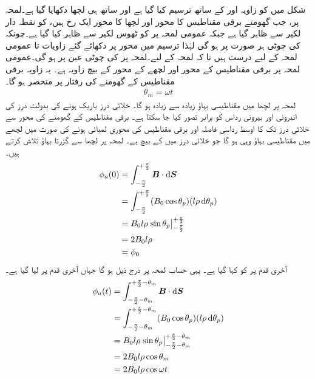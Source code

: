 %
شکل   میں  کو زاویہ  اور   کے ساتھ ترسیم کیا گیا ہے اور ساتھ ہی  لچھا  دکھایا گیا ہے۔لمحہ پر، جب  گھومتے برقی مقناطیس کا محور اور لچھا  کا محور ایک رخ  ہیں،    کو نقطہ دار  لکیر سے ظاہر گیا ہے جبکہ عمومی  لمحہ  پر   کو  ٹھوس لکیر سے   ظاہر کیا گیا ہے۔چونکہ  کی چوٹی ہر صورت  پر ہو گی لہٰذا  ترسیم میں محور  پر دکھائے گئے زاویات  تا  عمومی لمحہ  کے لیے درست  ہیں نا کہ لمحہ  کے لیے۔لمحہ  پر  کی چوٹی عین  پر ہو گی۔عمومی  لمحہ  پر برقی مقناطیس کے محور اور لچھے کے محور کے بیچ  زاویہ ہے۔ یہ زاویہ برقی مقناطیس کے گھومنے کی رفتار  پر منحصر ہو گا۔
\begin{align}
\theta_m=\omega t
\end{align}
لمحہ  پر لچھا  میں   مقناطیسی بہاؤ زیادہ سے زیادہ ہو گا۔ خلائی درز باریک ہونے کی بدولت درز کی اندرونی اور بیرونی رداس کو برابر تصور کیا جا سکتا ہے۔ برقی مقناطیس کے گھومنے کی محور سے  خلائی درز تک کا اوسط رداسی فاصلہ  اور  برقی مقناطیس کی محوری لمبائی  ہونے کی صورت میں لچھے میں  مقناطیسی بہاؤ وہی ہو گا جو  خلائی درز میں    کے بیچ ہے۔ لمحہ  پر  لچھا  سے گزرتا بہاؤ  تلاش کرتے ہیں۔
\begin{gather}
\begin{aligned}\label{مساوات_گھومتے_مشین_قطب_پر_بہاو}
\phi_a(0)&=\int_{-\frac{\pi}{2}}^{+\frac{\pi}{2}} \kvec{B} \cdot \dif \kvec{S}\\
&=\int_{-\frac{\pi}{2}}^{+\frac{\pi}{2}} (B_0 \cos \theta_p)(l \rho \dif \theta_p)\\
&=B_0 l \rho \left. \sin \theta_p \right\vert_{-\frac{\pi}{2}}^{+\frac{\pi}{2}}\\
&=2 B_0 l \rho\\
&=\phi_0
\end{aligned}
\end{gather}
آخری قدم پر   کو  کہا گیا ہے۔ یہی حساب  لمحہ  پر درج ذیل ہو گا جہاں آخری قدم پر  لیا گیا ہے۔
\begin{gather}
\begin{aligned}
\phi_a(t)&=\int_{-\frac{\pi}{2}-\theta_m}^{+\frac{\pi}{2}-\theta_m} \kvec{B} \cdot \dif \kvec{S}\\
&=\int_{-\frac{\pi}{2}-\theta_m}^{+\frac{\pi}{2}-\theta_m} (B_0 \cos \theta_p)(l \rho \dif \theta_p)\\
&=B_0 l \rho \left. \sin \theta_p \right\vert_{-\frac{\pi}{2}-\theta_m}^{+\frac{\pi}{2}-\theta_m}\\
&=2 B_0 l \rho \cos \theta_m\\
&=2 B_0 l \rho \cos \omega t
\end{aligned}
\end{gather}
